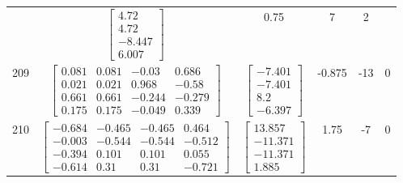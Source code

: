 \documentclass[a4paper,12pt]{article}
\begin{document}
\begin{tabular}{c c c c c c}
&
$\begin{bmatrix} 4.72 \\ 4.72 \\ -8.447 \\ 6.007 \end{bmatrix}$
&
0.75
&
7
&
2
\\
209
&
$\begin{bmatrix} 0.081 & 0.081 & -0.03 & 0.686 \\ 0.021 & 0.021 & 0.968 & -0.58 \\ 0.661 & 0.661 & -0.244 & -0.279 \\ 0.175 & 0.175 & -0.049 & 0.339 \end{bmatrix}$
&
$\begin{bmatrix} -7.401 \\ -7.401 \\ 8.2 \\ -6.397 \end{bmatrix}$
&
-0.875
&
-13
&
0
\\
210
&
$\begin{bmatrix} -0.684 & -0.465 & -0.465 & 0.464 \\ -0.003 & -0.544 & -0.544 & -0.512 \\ -0.394 & 0.101 & 0.101 & 0.055 \\ -0.614 & 0.31 & 0.31 & -0.721 \end{bmatrix}$
&
$\begin{bmatrix} 13.857 \\ -11.371 \\ -11.371 \\ 1.885 \end{bmatrix}$
&
1.75
&
-7
&
0
\\
\end{tabular} \egroup \newpage
\end{document}
